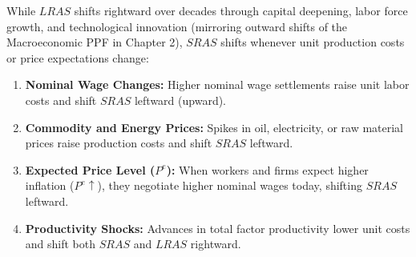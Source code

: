 \documentclass[11pt,letterpaper]{article}
\begin{document}
While $LRAS$ shifts rightward over decades through capital deepening, labor force growth, and technological innovation (mirroring outward shifts of the Macroeconomic PPF in Chapter 2), $SRAS$ shifts whenever unit production costs or price expectations change:
\begin{enumerate}
    \item \textbf{Nominal Wage Changes:} Higher nominal wage settlements raise unit labor costs and shift $SRAS$ leftward (upward).
    \item \textbf{Commodity and Energy Prices:} Spikes in oil, electricity, or raw material prices raise production costs and shift $SRAS$ leftward.
    \item \textbf{Expected Price Level ($P^e$):} When workers and firms expect higher inflation ($P^e \uparrow$), they negotiate higher nominal wages today, shifting $SRAS$ leftward.
    \item \textbf{Productivity Shocks:} Advances in total factor productivity lower unit costs and shift both $SRAS$ and $LRAS$ rightward.
\end{enumerate}
\end{document}
